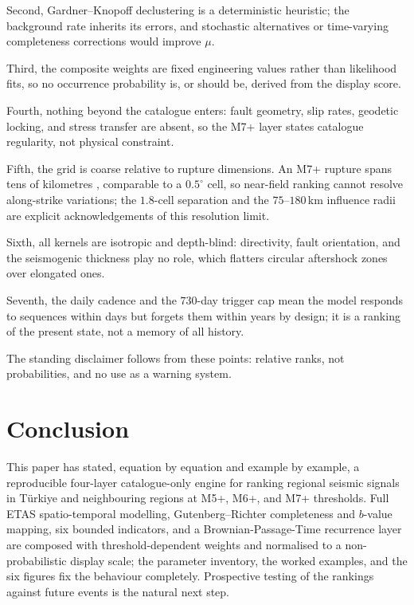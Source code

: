\documentclass[11pt,a4paper]{article}
\begin{document}
Second, Gardner--Knopoff declustering is a deterministic heuristic; the
background rate inherits its errors, and stochastic alternatives
\cite{zhuang2002} or time-varying completeness corrections
\cite{mizrahi2021} would improve $\mu$.

Third, the composite weights are fixed engineering values rather than
likelihood fits, so no occurrence probability is, or should be, derived
from the display score.

Fourth, nothing beyond the catalogue enters: fault geometry, slip rates,
geodetic locking, and stress transfer are absent, so the M7+ layer states
catalogue regularity, not physical constraint.

Fifth, the grid is coarse relative to rupture dimensions. An M7+ rupture
spans tens of kilometres \cite{wells1994}, comparable to a $0.5^\circ$ cell,
so near-field ranking cannot resolve along-strike variations; the
$1.8$-cell separation and the $75$--$180$\,km influence radii are explicit
acknowledgements of this resolution limit.

Sixth, all kernels are isotropic and depth-blind: directivity, fault
orientation, and the seismogenic thickness play no role, which flatters
circular aftershock zones over elongated ones.

Seventh, the daily cadence and the $730$-day trigger cap mean the model
responds to sequences within days but forgets them within years by design;
it is a ranking of the present state, not a memory of all history.

The standing disclaimer follows from these points: relative ranks, not
probabilities, and no use as a warning system.

\section{Conclusion}
This paper has stated, equation by equation and example by example, a
reproducible four-layer catalogue-only engine for ranking regional seismic
signals in T\"urkiye and neighbouring regions at M5+, M6+, and M7+
thresholds. Full ETAS spatio-temporal modelling, Gutenberg--Richter
completeness and $b$-value mapping, six bounded indicators, and a
Brownian-Passage-Time recurrence layer are composed with
threshold-dependent weights and normalised to a non-probabilistic display
scale; the parameter inventory, the worked examples, and the six figures fix
the behaviour completely. Prospective testing of the rankings against future
events is the natural next step.
\end{document}
